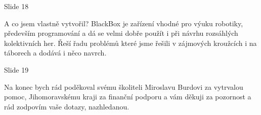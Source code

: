 Slide 18

A co jsem vlastně vytvořil? 
BlackBox je zařízení vhodné pro výuku robotiky, především programování a dá se velmi dobře použít i při návrhu rozsáhlých 
kolektivních her. Řeší řadu problémů které jsme řešili v zájmových kroužcích i na táborech a dodává i něco navrch.

Slide 19

Na konec bych rád poděkoval svému školiteli Miroslavu Burdovi za vytrvalou pomoc, Jihomoravskému kraji za finanční 
podporu a vám děkuji za pozornost a rád zodpovím vaše dotazy, nazhledanou.